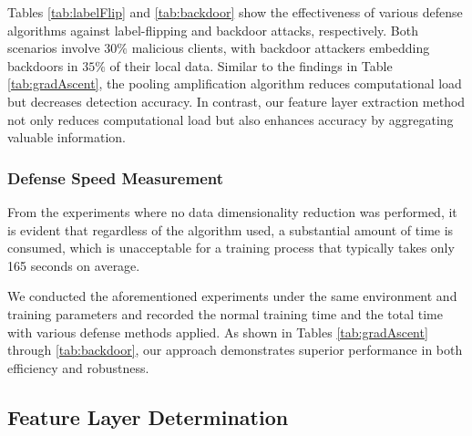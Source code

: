 \documentclass[conference]{IEEEtran}
\begin{document}
Tables \hyperref[tab:labelFlip]{\ref{tab:labelFlip}} and \hyperref[tab:backdoor]{\ref{tab:backdoor}} show the effectiveness of various defense algorithms against label-flipping and backdoor attacks, respectively. Both scenarios involve $30\%$ malicious clients, with backdoor attackers embedding backdoors in $35\%$ of their local data. Similar to the findings in Table \hyperref[tab:gradAscent]{\ref{tab:gradAscent}}, the pooling amplification algorithm reduces computational load but decreases detection accuracy. In contrast, our feature layer extraction method not only reduces computational load but also enhances accuracy by aggregating valuable information.

\subsubsection{\textbf{Defense Speed Measurement}}



From the experiments where no data dimensionality reduction was performed, it is evident that regardless of the algorithm used, a substantial amount of time is consumed, which is unacceptable for a training process that typically takes only 165 seconds on average.

We conducted the aforementioned experiments under the same environment and training parameters and recorded the normal training time and the total time with various defense methods applied. As shown in Tables \hyperref[tab:gradAscent]{\ref{tab:gradAscent}} through \hyperref[tab:backdoor]{\ref{tab:backdoor}}, our approach demonstrates superior performance in both efficiency and robustness.

\subsection{Feature Layer Determination}
\label{exp:exp_layer}
\end{document}
